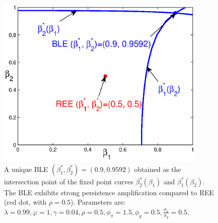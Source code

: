 \begin{figure}
    \begin{center}
     \includegraphics[width=4in]{ble_fig1.eps}
    \end{center}
   \caption{ \label{ble} A unique BLE $(\beta_1^*,\beta_2^*)=(0.9, 0.9592)$ obtained as the intersection point of the fixed point curves $\beta_2^*(\beta_1)$ and  $\beta_1^*(\beta_2)$. The BLE exhibits strong persistence amplification compared to REE (red dot, with $\rho=0.5$). Parameters are: $\lambda=0.99, \varphi=1, \gamma=0.04, \rho=0.5, \phi_\pi=1.5,\phi_y=0.5, \frac{\sigma_{\pi}}{\sigma_y}=0.5$.}
    \end{figure}




